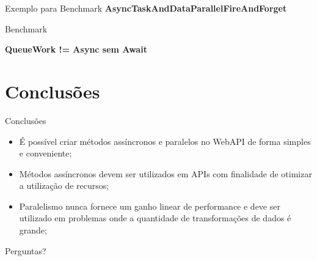 \documentclass[10pt]{beamer}
\begin{document}
\begin{frame}{Exemplo para Benchmark}
	\textbf{AsyncTaskAndDataParallelFireAndForget}
\end{frame}

\begin{frame}{Benchmark}
	\begin{figure}
	\end{figure}
	\textbf{QueueWork != Async sem Await}
\end{frame}

\section{Conclusões}

\begin{frame}{Conclusões}
	\begin{itemize}
		\item É possível criar métodos assíncronos e paralelos no WebAPI de forma simples e conveniente; 
		\item Métodos assíncronos devem ser utilizados em APIs com finalidade de otimizar a utilização de recursos;
		\item Paralelismo nunca fornece um ganho linear de performance e deve ser utilizado em problemas onde a quantidade de transformações de dados é grande;
	\end{itemize}
\end{frame}


\begin{frame}[standout]
  Perguntas?
\end{frame}
\end{document}
